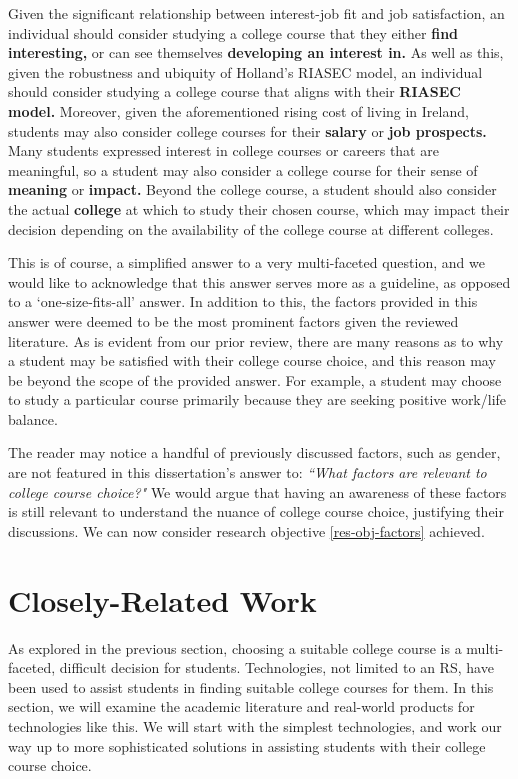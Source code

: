 Given the significant relationship between interest-job fit and job satisfaction,
an individual should consider studying a college course that they either \textbf{find interesting,} 
or can see themselves \textbf{developing an interest in.}
As well as this, given the robustness and ubiquity of Holland's RIASEC model,
an individual should consider studying a college course that aligns with their \textbf{RIASEC model.}
Moreover, given the aforementioned rising cost of living in Ireland,
students may also consider college courses for their \textbf{salary} or \textbf{job prospects.}
Many students expressed interest in college courses or careers that are meaningful, 
so a student may also consider a college course for their sense of \textbf{meaning} or \textbf{impact.}
Beyond the college course, a student should also consider the actual \textbf{college} at which to study their chosen course,
which may impact their decision depending on the availability of the college course at different colleges.

This is of course, a simplified answer to a very multi-faceted question,
and we would like to acknowledge that this answer serves more as a guideline,
as opposed to a `one-size-fits-all' answer.
In addition to this, the factors provided in this answer were deemed to be the most prominent factors
given the reviewed literature.
As is evident from our prior review, 
there are many reasons as to why a student may be satisfied with their college course choice,
and this reason may be beyond the scope of the provided answer.
For example, a student may choose to study a particular course primarily because they are seeking positive work/life balance.

The reader may notice a handful of previously discussed factors, such as gender, are not featured in this dissertation's answer to:
\emph{``What factors are relevant to college course choice?"}
We would argue that having an awareness of these factors
is still relevant to understand the nuance of college course choice,
justifying their discussions.
We can now consider research objective \ref{res-obj-factors} achieved.

\section{Closely-Related Work}
\label{sec:closely-related-work}

As explored in the previous section,
choosing a suitable college course is a multi-faceted, difficult decision for students.
Technologies, not limited to an RS, have been used to assist students in finding suitable college courses for them.
In this section, we will examine the academic literature and real-world products for technologies like this.
We will start with the simplest technologies, and work our way up to 
more sophisticated solutions in assisting students with their college course choice.


